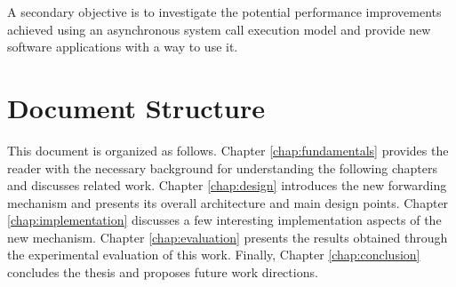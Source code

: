 A secondary objective is to investigate the potential performance improvements
achieved using an asynchronous system call execution model and provide new
software applications with a way to use it.

\section{Document Structure}

This document is organized as follows. Chapter \ref{chap:fundamentals} provides
the reader with the necessary background for understanding the following
chapters and discusses related work. Chapter \ref{chap:design} introduces the
new forwarding mechanism and presents its overall architecture and main design
points. Chapter \ref{chap:implementation} discusses a few interesting
implementation aspects of the new mechanism. Chapter \ref{chap:evaluation}
presents the results obtained through the experimental evaluation of this work.
Finally, Chapter \ref{chap:conclusion} concludes the thesis and proposes future
work directions.
